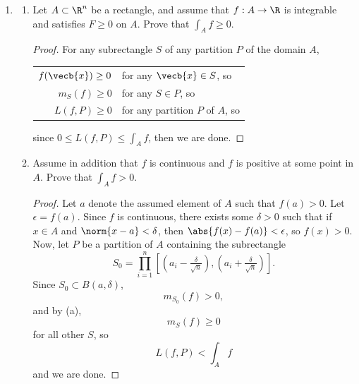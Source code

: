 \documentclass[letterpaper]{article}
\begin{document}
\begin{enumerate}
\begin{proof}
Therefore, given any $\epsilon>0$, we have produced a partition $P$ such that $U(f,P)-L(f,P)<\epsilon$, so we are done. 
\end{proof}

\item 
\begin{enumerate}
\item Let $A\subset \R^n$ be a rectangle, and assume that $f:A\to\R$ is integrable and satisfies $F\geq 0$ on $A$. Prove that $\int_A f\geq0$. 
\begin{proof}
For any subrectangle $S$ of any partition $P$ of the domain $A$, 

\begin{tabular}{rl}
$f(\vecb{x})\geq0$ &for any $\vecb{x}\in S$, so \\
$m_S(f)\geq0$ &for any $S\in P$, so \\
$L(f,P)\geq0$ &for any partition $P$ of $A$, so \\
\end{tabular}

since $0\leq L(f,P)\leq\int_A f$, then we are done. 
\end{proof}
\item Assume in addition that $f$ is continuous and $f$ is positive at some point in $A$. Prove that $\int_A f>0$. 
\begin{proof}
Let $a$ denote the assumed element of $A$ such that $f(a)>0$. Let $\epsilon=f(a)$. Since $f$ is continuous, there exists some $\delta>0$ such that if $x\in A$ and $\norm{x-a}<\delta$, then $\abs{f(x)-f(a)}<\epsilon$, so $f(x)>0$. Now, let $P$ be a partition of $A$ containing the subrectangle 
$$S_0=\prod_{i=1}^n\left[\left(a_i-\tfrac{\delta}{\sqrt{n}}\right),\left(a_i+\tfrac{\delta}{\sqrt{n}}\right)\right].$$
Since $S_0\subset B(a,\delta)$, 
$$m_{S_0}(f)>0,$$
and by (a), $$m_S(f)\geq0$$ for all other $S$, so $$L(f,P)<\int_A f$$ and we are done. 
\end{proof}
\end{enumerate}


\end{enumerate}
\end{document}
